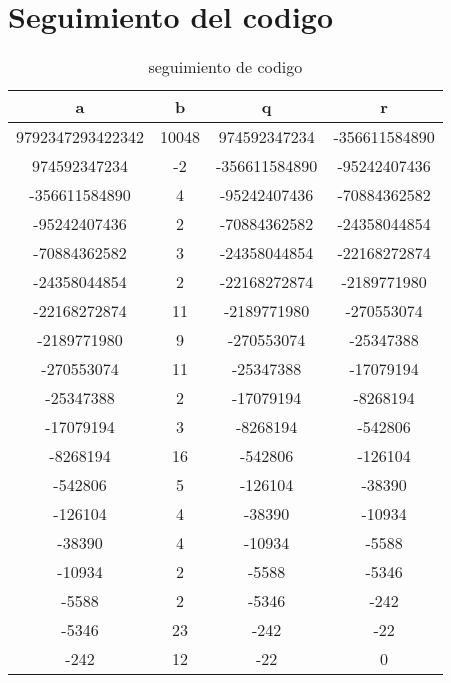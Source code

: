 \section{Seguimiento del codigo}
\begin{table}[H]
\label{tablax}
\begin{center}
\begin{tabular}{|c|c|c|c|}
\hline 
a&b&q&r \\
\hline
9792347293422342&10048&974592347234&-356611584890\\\hline
974592347234&-2&-356611584890&-95242407436\\\hline
-356611584890&4&-95242407436&-70884362582\\\hline
-95242407436&2&-70884362582&-24358044854\\\hline
-70884362582&3&-24358044854&-22168272874\\\hline
-24358044854&2&-22168272874&-2189771980\\\hline
-22168272874&11&-2189771980&-270553074\\\hline
-2189771980&9&-270553074&-25347388\\\hline
-270553074&11&-25347388&-17079194\\\hline
-25347388&2&-17079194&-8268194\\\hline
-17079194&3&-8268194&-542806\\\hline
-8268194&16&-542806&-126104\\\hline
-542806&5&-126104&-38390\\\hline
-126104&4&-38390&-10934\\\hline
-38390&4&-10934&-5588\\\hline
-10934&2&-5588&-5346\\\hline
-5588&2&-5346&-242\\\hline
-5346&23&-242&-22\\\hline
-242&12&-22&0\\\hline
\end{tabular}
\end{center}
\caption{seguimiento de codigo}
\end{table}